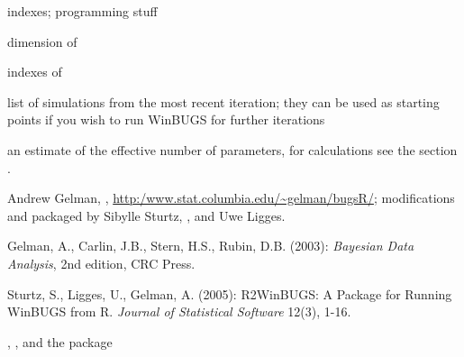\begin{Value}
\begin{ldescription}
\item[\code{long.short}] indexes; programming stuff
\item[\code{dimension.short}] dimension of 
\item[\code{indexes.short}] indexes of 
\item[\code{last.values}] list of simulations from the most recent iteration; they
can be used as starting points if you wish to run WinBUGS for further iterations
\item[\code{pD}] an estimate of the effective number of parameters, for calculations see the section .
\item[\code{DIC}] 
\end{ldescription}
\end{Value}
\begin{Author}\relax
Andrew Gelman, , \url{http:/www.stat.columbia.edu/~gelman/bugsR/};
modifications and packaged by Sibylle Sturtz, , and Uwe Ligges.
\end{Author}
\begin{References}\relax
Gelman, A., Carlin, J.B., Stern, H.S., Rubin, D.B. (2003):
\emph{Bayesian Data Analysis}, 2nd edition, CRC Press.

Sturtz, S., Ligges, U., Gelman, A. (2005):
R2WinBUGS: A Package for Running WinBUGS from R.
\emph{Journal of Statistical Software} 12(3), 1-16.
\end{References}
\begin{SeeAlso}\relax
{}, , and the  package
\end{SeeAlso}
